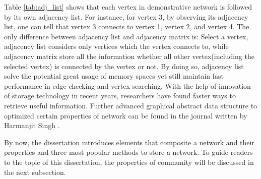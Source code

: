 \documentclass[12pt]{article}
\begin{document}
\begin{enumerate}[label=(\roman*)]
Table \ref{tab:adj_list} shows that each vertex in demonstrative network is followed by its own adjacency list. For instance, for vertex 3, by observing its adjacency list, one can tell that vertex 3 connects to vertex 1, vertex 2, and vertex 4. The only difference between adjacency list and adjacency matrix is:  Select a vertex, adjacency list considers only vertices which the vertex connects to, while adjacency matrix store all the information whether all other vertex(including the selected vertex) is connected by the vertex or not. By doing so, adjacency list solve the potential great usage of memory spaces yet still maintain fast performance in edge checking and vertex searching. With the help of innovation of storage technology in recent years, researchers have found faster ways to retrieve useful information. Further advanced graphical abstract data structure to optimized certain properties of network can be found in the journal written by Harmanjit Singh \cite{16}.

\end{enumerate}

By now, the dissertation introduces elements that composite a network and their properties and three most popular methods to store a network. To guide readers to the topic of this dissertation, the properties of community will be discussed in the next subsection.
\end{document}
